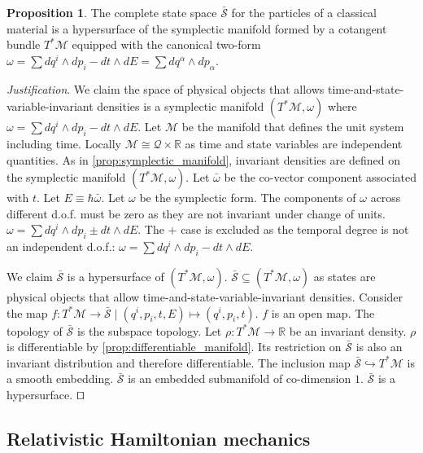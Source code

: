 \documentclass[smallextended]{svjour3}
\numberwithin{equation}{section}
\newenvironment{justification}{\emph{Justification}.}{\hfill\(\qed\)}
\theoremstyle{definition}
\newtheorem{prop}[equation]{Proposition}
\newenvironment{justification}{\emph{Justification}.}{\qed}
\begin{document}
\begin{prop}\label{prop:relativistic_symplectic_manifold}
	The complete state space $\bar{\mathcal{S}}$ for the particles of a classical material is a hypersurface of the symplectic manifold formed by a cotangent bundle $T^*\mathcal{M}$ equipped with the canonical two-form $\omega = \sum dq^i \wedge dp_i - dt \wedge dE = \sum dq^\alpha \wedge dp_\alpha$.
\end{prop}

\begin{justification}
	We claim the space of physical objects that allows time-and-state-variable-invariant densities is a symplectic manifold $(T^*\mathcal{M}, \omega)$ where $\omega = \sum dq^i \wedge dp_i - dt \wedge dE$. Let $\mathcal{M}$ be the manifold that defines the unit system including time. Locally $\mathcal{M} \cong \mathcal{Q} \times \mathbb{R}$ as time and state variables are independent quantities. As in \ref{prop:symplectic_manifold}, invariant densities are defined on the symplectic manifold $(T^*\mathcal{M}, \omega)$. Let $\bar{\omega}$ be the co-vector component associated with $t$. Let $E\equiv\hbar \bar{\omega}$. Let $\omega$ be the symplectic form. The components of $\omega$ across different d.o.f. must be zero as they are not invariant under change of units. $\omega=\sum dq^i \wedge dp_i \pm dt \wedge dE$. The $+$ case is excluded as the temporal degree is not an independent d.o.f.: $\omega = \sum dq^i \wedge dp_i - dt \wedge dE$.
	
	We claim $\bar{\mathcal{S}}$ is a hypersurface of $(T^*\mathcal{M}, \omega)$. $\bar{\mathcal{S}} \subseteq (T^*\mathcal{M}, \omega)$ as states are physical objects that allow time-and-state-variable-invariant densities. Consider the map $f : T^*\mathcal{M} \rightarrow \bar{\mathcal{S}} \; | \; (q^i, p_i, t, E) \mapsto (q^i, p_i, t)$. $f$ is an open map. The topology of $\bar{\mathcal{S}}$ is the subspace topology. Let $\rho : T^*\mathcal{M} \rightarrow \mathbb{R}$ be an invariant density. $\rho$ is differentiable by \ref{prop:differentiable_manifold}. Its restriction on $\bar{\mathcal{S}}$ is also an invariant distribution and therefore differentiable. The inclusion map $\bar{\mathcal{S}} \hookrightarrow T^*\mathcal{M}$ is a smooth embedding. $\bar{\mathcal{S}}$ is an embedded submanifold of co-dimension $1$. $\bar{\mathcal{S}}$ is a hypersurface.
\end{justification}


\subsection{Relativistic Hamiltonian mechanics}
\end{document}

